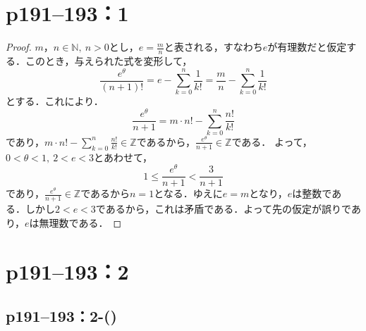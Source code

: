 \section*{p191--193：1}


\begin{tleftbar}
    \begin{proof}
        $m，n \in \mathbb{N},~n >0$とし，$e=\frac{m}{n}$と表される，すなわち$e$が有理数だと仮定する．このとき，与えられた式を変形して，
        \[
            \frac{e^\theta}{(n+1)!} = e-\sum_{k=0}^{n} \frac{1}{k!} =\frac{m}{n}-\sum_{k=0}^{n} \frac{1}{k!}
        \]
        とする．これにより．
        \[
            \frac{e^{\theta}}{n+1} = m \cdot n! - \sum_{k=0}^{n} \frac{n!}{k!}
        \]
        であり，$m \cdot n! - \sum_{k=0}^{n} \frac{n!}{k!} \in \mathbb{Z}$であるから，$\frac{e^{\theta}}{n+1} \in \mathbb{Z}$である．
        よって，$0< \theta <1,~2<e<3$とあわせて，
        \[
            1 \le \frac{e^{\theta}}{n+1} < \frac{3}{n+1}
        \]
        であり，$\frac{e^{\theta}}{n+1} \in \mathbb{Z}$であるから$n=1$となる．ゆえに$e=m$となり，$e$は整数である．しかし$2<e<3$であるから，これは矛盾である．よって先の仮定が誤りであり，$e$は無理数である．
    \end{proof}
\end{tleftbar}



\section*{p191--193：2}

\subsection*{p191--193：2-()}

